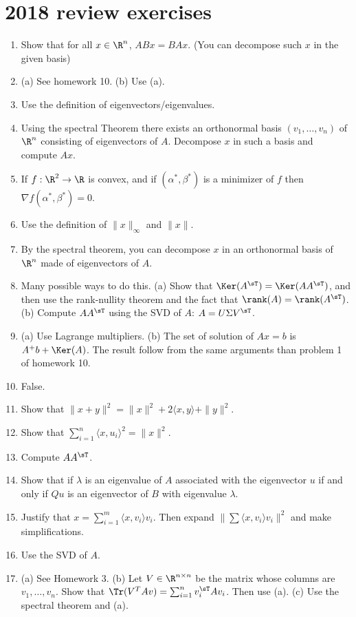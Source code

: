 \documentclass[11pt,nocut]{article}
\begin{document}
\section{2018 review exercises}

\begin{enumerate}
	\item Show that for all $x \in \R^n$, $ABx=BAx$. (You can decompose such $x$ in the given basis)
	\item (a) See homework 10. (b) Use (a).
	\item Use the definition of eigenvectors/eigenvalues.
	\item Using the spectral Theorem there exists an orthonormal basis $(v_1, \dots, v_n)$ of $\R^n$ consisting of eigenvectors of $A$. Decompose $x$ in such a basis and compute $Ax$.
	\item If $f: \R^2 \to \R$ is convex, and if $(\alpha^*,\beta^*)$ is a minimizer of $f$ then $\nabla f(\alpha^*,\beta^*) = 0$.
	\item Use the definition of $\|x\|_{\infty}$ and $\|x\|$.
	\item By the spectral theorem, you can decompose $x$ in an orthonormal basis of $\R^n$ made of eigenvectors of $A$.
	\item Many possible ways to do this. (a) Show that $\Ker(A^{\sT}) = \Ker(AA^{\sT})$, and then use the rank-nullity theorem and the fact that $\rank(A) = \rank(A^{\sT})$. (b) Compute $AA^{\sT}$ using the SVD of $A$: $A = U \Sigma V^{\sT}$.
	\item (a) Use Lagrange multipliers. (b)  The set of solution of $Ax=b$ is $A^+ b + \Ker(A)$. The result follow from the same arguments than problem 1 of homework 10. 
	\item False.
	\item Show that $\|x+y\|^2 = \|x\|^2 + 2 \langle x,y \rangle + \|y\|^2$.
	\item Show that $\sum_{i=1}^n \langle x,u_i \rangle^2 = \|x\|^2$.
	\item Compute $AA^{\sT}$.
	\item Show that if $\lambda$ is an eigenvalue of $A$ associated with the eigenvector $u$ if and only if $Qu$ is an eigenvector of $B$ with eigenvalue $\lambda$.
	\item Justify that $x = \sum_{i=1}^m \langle x,v_i\rangle v_i$. Then expand $\| \sum \langle x,v_i \rangle v_i \|^2$ and make simplifications.
	\item Use the SVD of $A$.
	\item (a) See Homework 3. (b) Let $V \in \R^{n \times n}$ be the matrix whose columns are $v_1, \dots, v_n$. Show that $\Tr(V^T A v) = \sum_{i=1}^n v_i^{\sT} A v_i$. Then use (a). (c) Use the spectral theorem and (a).

\end{enumerate}
\end{document}

